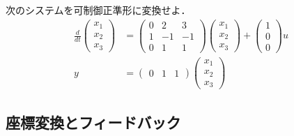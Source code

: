 次のシステムを可制御正準形に変換せよ．
\begin{align}
 \frac{d}{dt}
  \left(\begin{array}{c}
     {x}_1 \\
	 {x}_2 \\
	 {x}_3 
	\end{array}\right)
  &=
  \left(\begin{array}{ccc}
     0      & 2      & 3     \\
     1      & -1     & -1    \\
	 0      & 1      & 1     
	\end{array}\right)
  \left(\begin{array}{c}
     {x}_1 \\
	 {x}_2 \\
	 {x}_3 
	\end{array}\right)
  +
  \left(\begin{array}{c}
     1 \\
	 0 \\
	 0 
	\end{array}\right)
  u 
\nonumber \\
	y &= 
  \left(\begin{array}{ccc}
     0      & 1      & 1 
	\end{array}\right)
  \left(\begin{array}{c}
     {x}_1 \\
	 {x}_2 \\
	 {x}_3 
	\end{array}\right)
\nonumber 
\end{align}


\subsection{座標変換とフィードバック}

